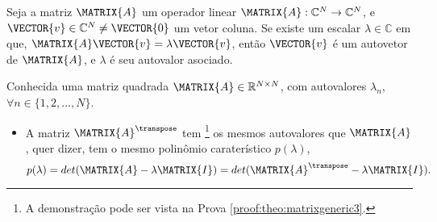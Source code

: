 \begin{definition}\label{def:matrixgeneric0}
Seja a matriz $\MATRIX{A}$ um operador linear $\MATRIX{A}: \mathbb{C}^{N} \rightarrow \mathbb{C}^{N}$,  
e $\VECTOR{v} \in \mathbb{C}^{N} \neq\VECTOR{0}$ um vetor coluna. 
Se existe um escalar $\lambda \in \mathbb{C}$ em que, 
$\MATRIX{A}\VECTOR{v}=\lambda\VECTOR{v}$,
então $\VECTOR{v}$ é um autovetor de $\MATRIX{A}$, e $\lambda$ é seu autovalor asociado.
\end{definition}


\begin{theorem}\label{theo:matrixgeneric3}
Conhecida uma matriz quadrada $\MATRIX{A} \in \mathbb{R}^{N \times N}$, 
com  autovalores $\lambda_n$, $\forall n \in \{1, 2, ..., N\}$.
\begin{itemize}
\item A matriz $\MATRIX{A}^{\transpose}$ tem
\footnote{A demonstração pode ser vista na Prova \ref{proof:theo:matrixgeneric3}.} 
os mesmos autovalores que $\MATRIX{A}$, quer dizer, tem o mesmo polinômio caraterístico $p(\lambda)$,
\begin{equation}
p(\lambda)=det(\MATRIX{A}-\lambda \MATRIX{I})=det(\MATRIX{A}^{\transpose}-\lambda \MATRIX{I}).
\end{equation}
\end{itemize}
\end{theorem}
